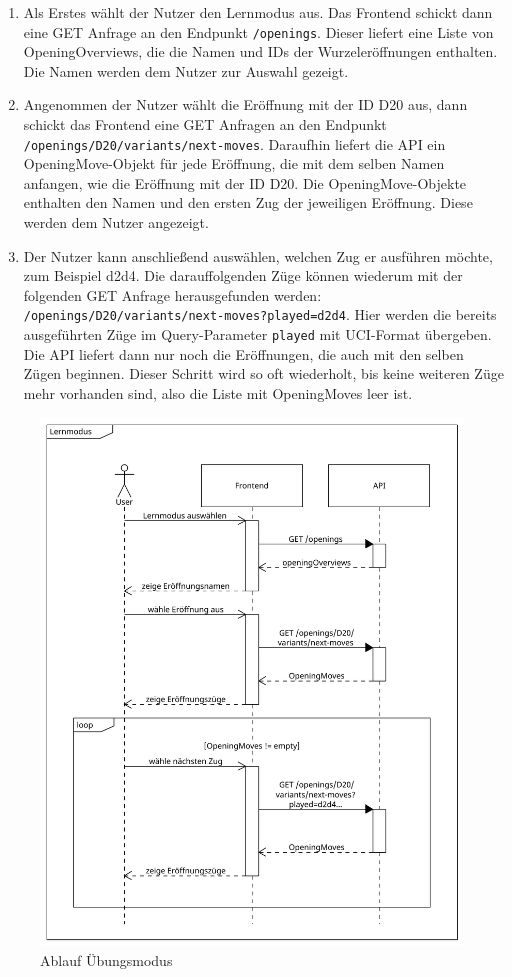 \begin{enumerate}
     \item Als Erstes wählt der Nutzer den Lernmodus aus. Das Frontend schickt dann eine GET Anfrage an den Endpunkt \lstinline{/openings}. Dieser liefert eine Liste von OpeningOverviews, die die Namen und IDs der Wurzeleröffnungen enthalten. Die Namen werden dem Nutzer zur Auswahl gezeigt.
     \item Angenommen der Nutzer wählt die Eröffnung mit der ID D20 aus, dann schickt das Frontend eine GET Anfragen an den Endpunkt \lstinline|/openings/D20/variants/next-moves|. Daraufhin liefert die API ein OpeningMove-Objekt für jede Eröffnung, die mit dem selben Namen anfangen, wie die Eröffnung mit der ID D20. Die OpeningMove-Objekte enthalten den Namen und den ersten Zug der jeweiligen Eröffnung. Diese werden dem Nutzer angezeigt.
     \item Der Nutzer kann anschließend auswählen, welchen Zug er ausführen möchte, zum Beispiel d2d4. Die darauffolgenden Züge können wiederum mit der folgenden GET Anfrage herausgefunden werden: \lstinline|/openings/D20/variants/next-moves?played=d2d4|. Hier werden die bereits ausgeführten Züge im Query-Parameter \lstinline{played} mit \ac{UCI}-Format übergeben. Die API liefert dann nur noch die Eröffnungen, die auch mit den selben Zügen beginnen. Dieser Schritt wird so oft wiederholt, bis keine weiteren Züge mehr vorhanden sind, also die Liste mit OpeningMoves leer ist.
\end{enumerate}

\begin{figure}[p]
    \includegraphics[width=\linewidth]{images/diagrams/sd_opening_training}
    \caption{Ablauf Übungsmodus}
    \label{fig:sd_opening_training}
\end{figure}

